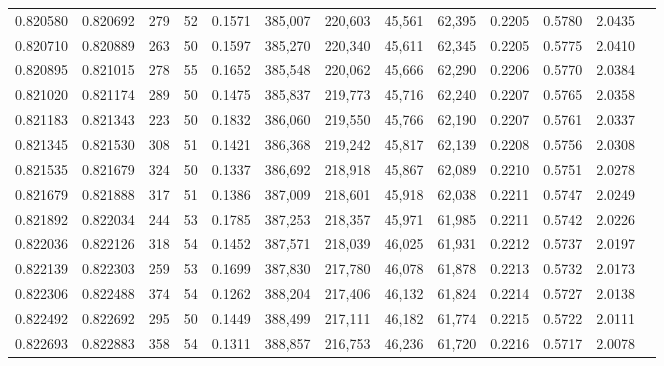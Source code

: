 \begin{tabular}{rrrrrrrrrrrrr}
0.820580 & 0.820692 &   279 &  52 &                                     0.1571 & 385,007 & 220,603 &  45,561 &  62,395 & 0.2205 & 0.5780 & 2.0435 \\
0.820710 & 0.820889 &   263 &  50 &                                     0.1597 & 385,270 & 220,340 &  45,611 &  62,345 & 0.2205 & 0.5775 & 2.0410 \\
0.820895 & 0.821015 &   278 &  55 &                                     0.1652 & 385,548 & 220,062 &  45,666 &  62,290 & 0.2206 & 0.5770 & 2.0384 \\
0.821020 & 0.821174 &   289 &  50 &                                     0.1475 & 385,837 & 219,773 &  45,716 &  62,240 & 0.2207 & 0.5765 & 2.0358 \\
0.821183 & 0.821343 &   223 &  50 &                                     0.1832 & 386,060 & 219,550 &  45,766 &  62,190 & 0.2207 & 0.5761 & 2.0337 \\
0.821345 & 0.821530 &   308 &  51 &                                     0.1421 & 386,368 & 219,242 &  45,817 &  62,139 & 0.2208 & 0.5756 & 2.0308 \\
0.821535 & 0.821679 &   324 &  50 &                                     0.1337 & 386,692 & 218,918 &  45,867 &  62,089 & 0.2210 & 0.5751 & 2.0278 \\
0.821679 & 0.821888 &   317 &  51 &                                     0.1386 & 387,009 & 218,601 &  45,918 &  62,038 & 0.2211 & 0.5747 & 2.0249 \\
0.821892 & 0.822034 &   244 &  53 &                                     0.1785 & 387,253 & 218,357 &  45,971 &  61,985 & 0.2211 & 0.5742 & 2.0226 \\
0.822036 & 0.822126 &   318 &  54 &                                     0.1452 & 387,571 & 218,039 &  46,025 &  61,931 & 0.2212 & 0.5737 & 2.0197 \\
0.822139 & 0.822303 &   259 &  53 &                                     0.1699 & 387,830 & 217,780 &  46,078 &  61,878 & 0.2213 & 0.5732 & 2.0173 \\
0.822306 & 0.822488 &   374 &  54 &                                     0.1262 & 388,204 & 217,406 &  46,132 &  61,824 & 0.2214 & 0.5727 & 2.0138 \\
0.822492 & 0.822692 &   295 &  50 &                                     0.1449 & 388,499 & 217,111 &  46,182 &  61,774 & 0.2215 & 0.5722 & 2.0111 \\
0.822693 & 0.822883 &   358 &  54 &                                     0.1311 & 388,857 & 216,753 &  46,236 &  61,720 & 0.2216 & 0.5717 & 2.0078 \\

\end{tabular}
